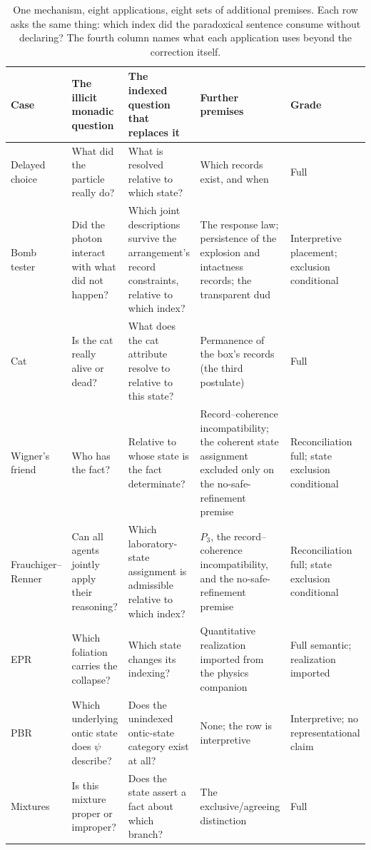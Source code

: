 \begin{table}[htbp]
\centering
\caption{One mechanism, eight applications, eight sets of additional premises. Each row asks the same thing: which index did the paradoxical sentence consume without declaring? The fourth column names what each application uses beyond the correction itself.}
\label{tab:schema}
\small
\begin{tabular}{p{} p{} p{} p{} p{}}
\toprule
\textbf{Case} & \textbf{The illicit monadic question} & \textbf{The indexed question that replaces it} & \textbf{Further premises} & \textbf{Grade} \\
\midrule
Delayed choice & What did the particle really do? & What is resolved relative to which state? & Which records exist, and when & Full \\
Bomb tester & Did the photon interact with what did not happen? & Which joint descriptions survive the arrangement's record constraints, relative to which index? & The response law; persistence of the explosion and intactness records; the transparent dud & Interpretive placement; exclusion conditional \\
Cat & Is the cat really alive or dead? & What does the cat attribute resolve to relative to this state? & Permanence of the box's records (the third postulate) & Full \\
Wigner's friend & Who has the fact? & Relative to whose state is the fact determinate? & Record--coherence incompatibility; the coherent state assignment excluded only on the no-safe-refinement premise & Reconciliation full; state exclusion conditional \\
Frauchiger--Renner & Can all agents jointly apply their reasoning? & Which laboratory-state assignment is admissible relative to which index? & $P_3$, the record--coherence incompatibility, and the no-safe-refinement premise & Reconciliation full; state exclusion conditional \\
EPR & Which foliation carries the collapse? & Which state changes its indexing? & Quantitative realization imported from the physics companion & Full semantic; realization imported \\
PBR & Which underlying ontic state does $\psi$ describe? & Does the unindexed ontic-state category exist at all? & None; the row is interpretive & Interpretive; no representational claim \\
Mixtures & Is this mixture proper or improper? & Does the state assert a fact about which branch? & The exclusive/agreeing distinction & Full \\
\bottomrule
\end{tabular}
\end{table}

